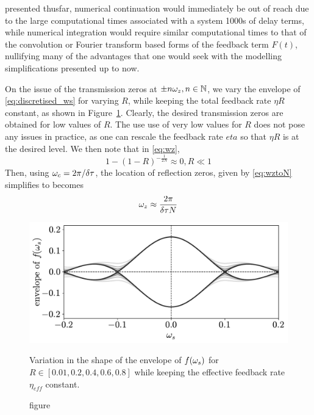 presented thusfar, numerical continuation would immediately be out of reach due to the large computational times associated with a system 1000s of delay terms, while numerical integration would require similar computational times to that of the convolution or Fourier transform based forms of the feedback term $F(t)$, nullifying many of the advantages that one would seek with the modelling simplifications presented up to now. 
%
\par
%
On the issue of the transmission zeros at $\pm n \omega_z, n \in \mathbb{N}$, we vary the envelope of \eqref{eq:discretised_ws} for varying $R$, while keeping the total feedback rate $\eta R$ constant, as shown in Figure~\ref{fig:discretised_EGM_envelope_variations}. Clearly, the desired transmission zeros are obtained for low values of $R$. The use use of very low values for $R$ does not pose any issues in practice, as one can rescale the feedback rate $eta$ so that $\eta R$ is at the desired level. We then note that in \eqref{eq:wz},
%
\begin{equation*}
    1-(1-R)^{-\frac{1}{2N}} \approx 0, R\ll1
\end{equation*}
%
Then, using $\omega_c = 2\pi/\delta \tau$, the location of reflection zeros, given by \eqref{eq:wztoN} simplifies to becomes
%
\begin{equation}
    \label{eq:wz_approx}
    \omega_z \approx \frac{2\pi}{\delta \tau N}
\end{equation}
%
%
\begin{figure}
    \centering 
    
    \includegraphics[width=0.75\linewidth]{Images/Chapter 2/discretised_EGM_envelope_variations.pdf}   
    
    \caption{figure}{Variation in the shape of the envelope of $f(\omega_s)$ for $R \in [0.01, 0.2, 0.4, 0.6, 0.8]$ while keeping the effective feedback rate $\eta_{eff}$ constant.}
    
    \label{fig:discretised_EGM_envelope_variations}
\end{figure}
